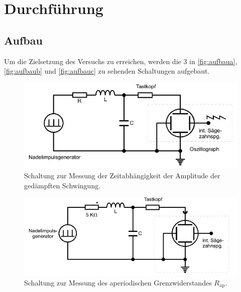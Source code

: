 \section{Durchführung}
\label{sec:Durchführung}
\subsection{Aufbau}
Um die Zielsetzung des Versuchs zu erreichen, werden die 3 in \autoref{fig:aufbaua}, \autoref{fig:aufbaub} und \autoref{fig:aufbauc} zu sehenden Schaltungen aufgebaut.
\begin{figure}[H]
    \centering
    \includegraphics[width=\textwidth]{bilder/aufbaua.JPG}
    \caption{Schaltung zur Messung der Zeitabhängigkeit der Amplitude der gedämpften Schwingung. \cite{sample}}
    \label{fig:aufbaua}
  \end{figure}
\noindent

\begin{figure}[H]
    \centering
    \includegraphics[width=\textwidth]{bilder/aufbaub.JPG}
    \caption{Schaltung zur Messung des aperiodischen Grenzwiderstandes $R_{\text{ap}}$. \cite{sample}}
    \label{fig:aufbaub}
  \end{figure}
\noindent

